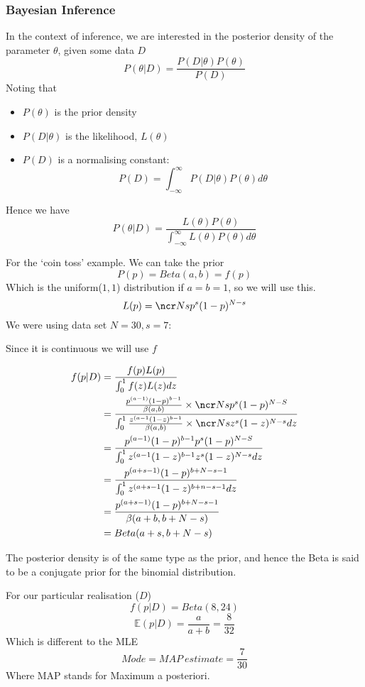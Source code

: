 \documentclass{/home/janmebows/Documents/LatexTemplates/myassignment}
\begin{document}
\subsubsection{Bayesian Inference}
In the context of inference, we are interested in the posterior density of the parameter $\theta$, given some data $D$
\[P(\theta| D) = \frac{P(D|\theta)P(\theta)}{P(D)}\]
Noting that
\begin{itemize}
    \item $P(\theta)$ is the prior density
    \item $P(D|\theta)$ is the likelihood, $L(\theta)$
    \item $P(D)$ is a normalising constant:
    \[P(D) =\int_{-\infty}^\infty P(D | \theta) P(\theta) d\theta\]
\end{itemize}

Hence we have
\[P(\theta | D) = \frac{L(\theta) P(\theta)}{\int_{-\infty}^\infty L(\theta) P(\theta) d\theta}\]

For the `coin toss' example. We can take the prior 
\[P(p) = Beta(a,b) = f(p)\]
Which is the uniform($1,1$) distribution if $a=b=1$, so we will use this.
\[L(p) = \ncr Ns p^s(1-p)^{N-s}\]
We were using data set $N=30,s=7$:

Since it is continuous we will use $f$

\begin{align*}
    f(p|D) &= \frac{f(p)L(p)}{\int_0^1 f(z)L(z)dz}\\
    &=\frac{\frac{p^{(a-1)} (1-p)^{b-1}}{\beta(a,b)} \times \ncr Ns p^s (1-p)^{N-S}}{\int_0^1 \frac{z^{(a-1} (1-z)^{b-1}}{\beta(a,b)} \times \ncr Ns z^s (1-z)^{N-s} dz}\\
    &= \frac{p^{(a-1)} (1-p)^{b-1}p^s (1-p)^{N-S}}{\int_0^1 z^{(a-1} (1-z)^{b-1} z^s (1-z)^{N-s} dz}\\
    &= \frac{p^{(a+s-1)} (1-p)^{b+N-s-1}}{\int_0^1 z^{(a+s-1} (1-z)^{b+n-s-1}dz}\\
    &= \frac{p^{(a+s-1)} (1-p)^{b+N-s-1}}{\beta(a+b,b+N-s)}\\
    &= Beta(a+s,b+N-s)
\end{align*}

The posterior density is of the same type as the prior, and hence the Beta is said to be a conjugate prior for the binomial distribution.

For our particular realisation ($D$)
\[f(p|D) = Beta(8,24)\]
\[\mathbb{E}(p|D) = \frac{a}{a+b} =\frac{8}{32}\]
Which is different to the MLE
\[Mode = MAP \ estimate  = \frac{7}{30}\]
Where MAP stands for Maximum a posteriori.
\end{document}

